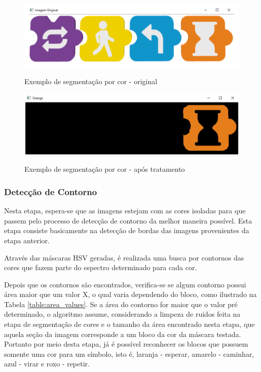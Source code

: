     \begin{figure}[H]
        \caption{Exemplo de segmentação por cor - original}
        \centering
        \includegraphics[width=\linewidth]{Imagens/Cap4/ex1_original.PNG}
        \label{figura:ex1_original}
    \end{figure}
    
    
    \begin{figure}[H]
        \caption{Exemplo de segmentação por cor - após tratamento}
        \centering
        \includegraphics[width=\linewidth]{Imagens/Cap4/ex1_tratado.PNG}
        \label{figura:ex1_tratado}
    \end{figure}
    
    \subsubsection{Detecção de Contorno}
    Nesta etapa, espera-se que as imagens estejam com as cores isoladas para que passem pelo processo de detecção de contorno da melhor maneira possível. Esta etapa consiste basicamente na detecção de bordas das imagens provenientes da etapa anterior.

    Através das máscaras HSV geradas, é realizada uma busca por contornos das cores que fazem parte do espectro determinado para cada cor.
    
    Depois que os contornos são encontrados, verifica-se se algum contorno possui área maior que um valor X, o qual varia dependendo do bloco, como ilustrado na Tabela \ref{table:area_values}. Se a área do contorno for maior que o valor pré determinado, o algoritmo assume, considerando a limpeza de ruídos feita na etapa de segmentação de cores e o tamanho da área encontrado nesta etapa, que aquela seção da imagem corresponde a um bloco da cor da máscara testada. Portanto por meio desta etapa, já é possível reconhecer os blocos que possuem somente uma cor para um símbolo, isto é, laranja - esperar, amarelo - caminhar, azul - virar e roxo - repetir.
    
